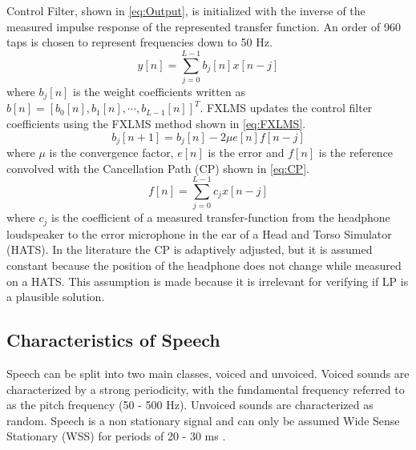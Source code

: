 Control Filter, shown in \autoref{eq:Output}, is initialized with the inverse of the measured impulse response of the represented transfer function. An order of 960 taps is chosen to represent frequencies down to 50 Hz.
\begin{equation}\label{eq:Output}
y[n]=\sum_{j=0}^{L-1}b_j[n]x[n-j]
\end{equation}
where $b_j[n]$ is the weight coefficients written as  $b[n]=[b_0[n],b_1[n], \cdots, b_{L-1}[n]]^T$. FXLMS updates the control filter coefficients using the FXLMS method shown in \autoref{eq:FXLMS}.
\begin{equation}\label{eq:FXLMS}
b_j[n+1] = b_j[n] - 2\mu e[n]f[n-j]
\end{equation}
where $\mu$ is the convergence factor, $e[n]$ is the error and $f[n]$ is the reference convolved with the Cancellation Path (CP) shown in \autoref{eq:CP}.
\begin{equation}\label{eq:CP}
f[n]=\sum_{j=0}^{L-1}c_jx[n-j]
\end{equation}
where $c_j$ is the coefficient of a measured transfer-function from the headphone loudspeaker to the error microphone in the ear of a Head and Torso Simulator (HATS). In the literature \cite{Hansen} the CP is adaptively adjusted, but it is assumed constant because the position of the headphone does not change while measured on a HATS. This assumption is made because it is irrelevant for verifying if LP is a plausible solution. 





\subsection{Characteristics of Speech}
Speech can be split into two main classes, voiced and unvoiced. Voiced sounds are characterized by a strong periodicity, with the fundamental frequency referred to as the pitch frequency (50 - 500 Hz). Unvoiced sounds are characterized as random. Speech is a non stationary signal and can only be assumed Wide Sense Stationary (WSS) for periods of 20 - 30 ms \cite{Speech}. 

